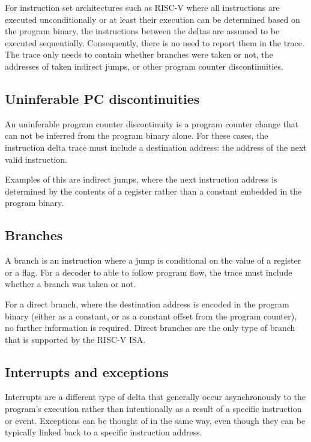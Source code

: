 For instruction set architectures such as RISC-V where all instructions are executed
unconditionally or at least their execution can be determined based on
the program binary, the instructions between the deltas are assumed to be
executed sequentially. Consequently, there is no need
to report them in the trace. The trace only needs to contain whether
branches were taken or not, the addresses of taken indirect jumps, or
other program counter discontinuities.

\subsection{Uninferable PC discontinuities} \label{uninfpc}

An uninferable program counter discontinuity is a program counter change
that can not be inferred from the program binary alone. For these cases,
the instruction delta trace must include a destination address: the
address of the next valid instruction.

Examples of this are indirect jumps, where
the next instruction address is determined by the contents of a
register rather than a constant embedded in the program binary.

\subsection{Branches} \label{branches}

A branch is an instruction where a jump is conditional on the
value of a register or a flag. For a decoder to able to follow program flow,
the trace must include whether a branch was taken or not.

For a direct branch, where the destination address is encoded in the 
program binary (either as a constant, or as a constant offset from the
program counter), no further information is required.
Direct branches are the only type of branch that is supported by the
RISC-V ISA.

\subsection{Interrupts and exceptions} \label{interruptsexceptions}

Interrupts are a different type of delta that generally occur
asynchronously to the program's execution rather than intentionally as
a result of a specific instruction or event. Exceptions can be thought
of in the same way, even though they can be typically linked back to a
specific instruction address.

